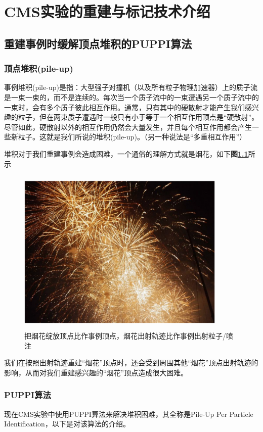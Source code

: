 \chapter{CMS实验的重建与标记技术介绍}
\label{chap3}
\fontsize{12bp}{14.4pt}
\section{重建事例时缓解顶点堆积的PUPPI算法}
\subsection{顶点堆积(pile-up)}
事例堆积(pile-up)是指：大型强子对撞机（以及所有粒子物理加速器）上的质子流是一束一束的，而不是连续的。每次当一个质子流中的一束遭遇另一个质子流中的一束时，会有多个质子彼此相互作用。通常，只有其中的硬散射才能产生我们感兴趣的粒子，但在两束质子遭遇时一般只有小于等于一个相互作用顶点是“硬散射”。尽管如此，硬散射以外的相互作用仍然会大量发生，并且每个相互作用都会产生一些新粒子。这就是我们所说的堆积(pile-up)。（另一种说法是“多重相互作用”）

堆积对于我们重建事例会造成困难，一个通俗的理解方式就是烟花，如下\textbf{图\ref{fig:3.1}}所示
\begin{figure}[H]
 \centering
 \includegraphics[height=8cm, width=10cm]{pictures/firework.png}
 \caption{把烟花绽放顶点比作事例顶点，烟花出射轨迹比作事例出射粒子/喷注}
 \label{fig:3.1}
\end{figure}
我们在按照出射轨迹重建“烟花”顶点时，还会受到周围其他“烟花”顶点出射轨迹的影响，从而对我们重建感兴趣的“烟花”顶点造成很大困难。

\subsection{PUPPI算法}
现在CMS实验中使用PUPPI算法来解决堆积困难，其全称是Pile-Up Per Particle Identification\cite{Pileup_Per_Particle_Identification}，以下是对该算法的介绍。

